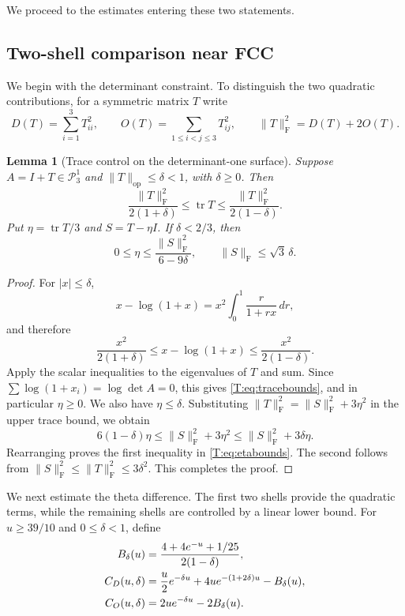 \documentclass[reqno,english]{amsart}
\newtheorem{lemma}[theorem]{Lemma}
\theoremstyle{definition}
\newtheorem{open problem}[theorem]{Open Problem}
\theoremstyle{remark}
\theoremstyle{plain}
\numberwithin{equation}{section}
\newcommand{\PP}{\mathcal P_3^1}
\newcommand{\tr}{\operatorname{tr}}
\newcommand{\op}{\mathrm{op}}
\newcommand{\frob}{\mathrm F}
\newcommand{\Id}{I}
\begin{document}
We proceed to the estimates entering these two statements.

\subsection{Two-shell comparison near FCC}
We begin with the determinant constraint. To distinguish the two
quadratic contributions, for a symmetric matrix $T$ write
\[
 D(T)=\sum_{i=1}^3T_{ii}^2,\qquad
 O(T)=\sum_{1\le i<j\le3}T_{ij}^2,
 \qquad \|T\|_{\frob}^2=D(T)+2O(T).
\]

\begin{lemma}[Trace control on the determinant-one surface]\label{T:lem:det}
Suppose $A=\Id+T\in\PP$ and $\|T\|_{\op}\le\delta<1$, with $\delta\ge0$. Then
\begin{equation}\label{T:eq:tracebounds}
 \frac{\|T\|_{\frob}^2}{2(1+\delta)}
 \le\tr T\le
 \frac{\|T\|_{\frob}^2}{2(1-\delta)}.
\end{equation}
Put $\eta=\tr T/3$ and $S=T-\eta\Id$. If $\delta<2/3$, then
\begin{equation}\label{T:eq:etabounds}
 0\le\eta\le\frac{\|S\|_{\frob}^2}{6-9\delta},
 \qquad \|S\|_{\frob}\le\sqrt3\,\delta.
\end{equation}
\end{lemma}
\begin{proof}
For $|x|\le\delta$,
\[
 x-\log(1+x)=x^2\int_0^1\frac{r}{1+rx}\,dr,
\]
and therefore
\[
 \frac{x^2}{2(1+\delta)}\le x-\log(1+x)
 \le\frac{x^2}{2(1-\delta)}.
\]
Apply the scalar inequalities to the eigenvalues of $T$ and sum.
Since $\sum\log(1+x_i)=\log\det A=0$, this gives
\eqref{T:eq:tracebounds}, and in particular $\eta\ge0$.
We also have $\eta\le\delta$. Substituting
$\|T\|_{\frob}^2=\|S\|_{\frob}^2+3\eta^2$ in the upper trace
bound, we obtain
\[
 6(1-\delta)\eta\le\|S\|_{\frob}^2+3\eta^2
 \le\|S\|_{\frob}^2+3\delta\eta.
\]
Rearranging proves the first inequality in \eqref{T:eq:etabounds}.
The second follows from
$\|S\|_{\frob}^2\le\|T\|_{\frob}^2\le3\delta^2$.
This completes the proof.
\end{proof}

We next estimate the theta difference. The first two shells provide
the quadratic terms, while the remaining shells are controlled by a
linear lower bound. For $u\ge39/10$ and $0\le\delta<1$, define
\begin{align}\label{T:eq:Bcoeff}
 B_\delta(u)&=\frac{4+4e^{-u}+1/25}{2(1-\delta)},\notag\\
 C_D(u,\delta)&=\frac{u}{2}e^{-\delta u}
      +4u e^{-(1+2\delta)u}-B_\delta(u),\\
 C_O(u,\delta)&=2u e^{-\delta u}-2B_\delta(u).\notag
\end{align}
\end{document}
